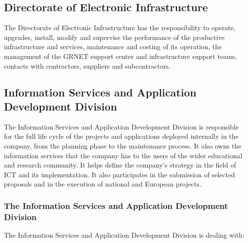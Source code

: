 \subsection{Directorate of Electronic Infrastructure}
The Directorate of Electronic Infrastructure has the responsibility to operate, upgrades, install, modify
and supervise the performance of the productive infrastructure and services,
maintenance and costing of its operation, the management of the GRNET support center and infrastructure support teams,
contacts with contractors, suppliers and subcontractors.

\subsection{Information Services and Application Development Division}
The Information Services and Application Development Division is responsible for the full life cycle of the projects
and applications deployed internally in the company, from the planning phase to the maintenance process.
It also owns the information services that the company has to the users of the wider educational and research community.
It helps define the company's strategy in the field of ICT and its implementation.
It also participates in the submission of selected proposals and in the execution of national and European projects.

\subsubsection{The Information Services and Application Development Division}
The Information Services and Application Development Division is dealing with:

